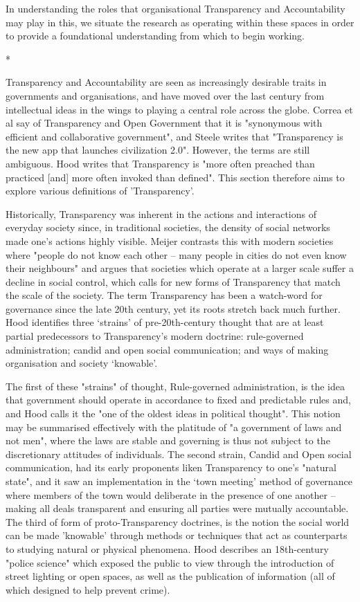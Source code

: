 In understanding the roles that organisational Transparency and Accountability may play in this, we situate the research as operating within these spaces in order to provide a foundational understanding from which to begin working.

*

Transparency and Accountability are seen as increasingly desirable traits in governments and organisations, and have moved over the last century from intellectual ideas in the wings to playing a central role across the globe. Correa et al say of Transparency and Open Government that it is "synonymous with efficient and collaborative government", and Steele writes that "Transparency is the new app that launches civilization 2.0". However, the terms are still ambiguous. Hood writes that Transparency is "more often preached than practiced [and] more often invoked than defined". This section therefore aims to explore various definitions of 'Transparency'.

Historically, Transparency was inherent in the actions and interactions of everyday society since, in traditional societies, the density of social networks made one's actions highly visible. Meijer contrasts this with modern societies where "people do not know each other -- many people in cities do not even know their neighbours" and argues that societies which operate at a larger scale suffer a decline in social control, which calls for new forms of Transparency that match the scale of the society. The term Transparency has been a watch-word for governance since the late 20th century, yet its roots stretch back much further. Hood identifies three `strains' of pre-20th-century thought that are at least partial predecessors to Transparency's modern doctrine: rule-governed administration; candid and open social communication; and ways of making organisation and society `knowable'.

The first of these "strains" of thought, Rule-governed administration, is the idea that government should operate in accordance to fixed and predictable rules and, and Hood calls it the "one of the oldest ideas in political thought". This notion may be summarised effectively with the platitude of "a government of laws and not men", where the laws are stable and governing is thus not subject to the discretionary attitudes of individuals. The second strain, Candid and Open social communication, had its early proponents liken Transparency to one's "natural state", and it saw an implementation in the `town meeting' method of governance where members of the town would deliberate in the presence of one another -- making all deals transparent and ensuring all parties were mutually accountable. The third of form of proto-Transparency doctrines, is the notion the social world can be made 'knowable' through methods or techniques that act as counterparts to studying natural or physical phenomena. Hood describes an 18th-century "police science" which exposed the public to view through the introduction of street lighting or open spaces, as well as the publication of information (all of which designed to help prevent crime).

